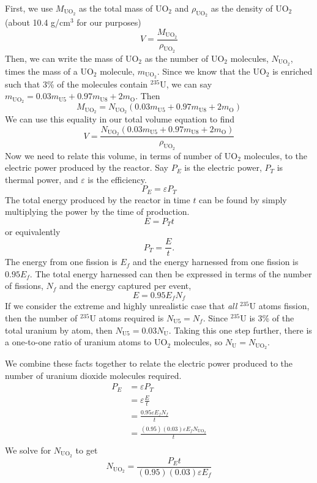 \documentclass{report}
\begin{document}
First, we use $M_{\text{UO}_2}$ as the total mass of UO$_2$ and $\rho_{\text{UO}_2}$ as the density of UO$_2$ (about 10.4 g/cm$^3$ for our purposes)
$$ V = \frac{M_{\text{UO}_2}}{\rho_{\text{UO}_2}} $$
Then, we can write the mass of UO$_2$ as the number of UO$_2$ molecules, $N_{\text{UO}_2}$, times the mass of a UO$_2$ molecule, $m_{\text{UO}_2}$. Since we know that the UO$_2$ is enriched such that 3\% of the molecules contain $^{235}$U, we can say $m_{\text{UO}_2} = 0.03m_{\text{U5}} + 0.97m_{\text{U8}} + 2m_{\text{O}}$. Then
$$ M_{\text{UO}_2} = N_{\text{UO}_2}(0.03m_{\text{U5}} + 0.97m_{\text{U8}} + 2m_{\text{O}}) $$
We can use this equality in our total volume equation to find
\begin{equation}
\label{vol}
V = \frac{N_{\text{UO}_2}(0.03m_{\text{U5}} + 0.97m_{\text{U8}} + 2 m_{\text{O}})}{\rho_{\text{UO}_2}}
\end{equation}
Now we need to relate this volume, in terms of number of UO$_2$ molecules, to the electric power produced by the reactor. Say $P_E$ is the electric power, $P_T$ is thermal power, and $\varepsilon$ is the efficiency. 
$$ P_E = \varepsilon P_T $$
The total energy produced by the reactor in time $t$ can be found by simply multiplying the power by the time of production.
$$ E = P_T t $$
or equivalently
$$ P_T = \frac{E}{t} .$$
The energy from one fission is $E_f$ and the energy harnessed from one fission is $0.95E_f$. The total energy harnessed can then be expressed in terms of the number of fissions, $N_f$ and the energy captured per event,
$$ E = 0.95E_f N_f $$
If we consider the extreme and highly unrealistic case that \textit{all} $^{235}$U atoms fission, then the number of $^{235}$U atoms required is $N_{\text{U5}} = N_f$. Since $^{235}$U is 3\% of the total uranium by atom, then $N_{\text{U5}} = 0.03N_{\text{U}}$. Taking this one step further, there is a one-to-one ratio of uranium atoms to UO$_2$ molecules, so $N_{\text{U}} = N_{\text{UO}_2}$.

We combine these facts together to relate the electric power produced to the number of uranium dioxide molecules required.
\begin{align*} 
P_E	&= \varepsilon P_T \\
	&= \varepsilon \frac{E}{t} \\
	&= \frac{0.95\varepsilon E_f N_f}{t} \\
	&= \frac{(0.95)(0.03)\varepsilon E_f N_{\text{UO}_2}}{t} \\
\end{align*}
We solve for $N_{\text{UO}_2}$ to get
\begin{equation}
\label{num}
N_{\text{UO}_2} = \frac{P_E t}{(0.95)(0.03)\varepsilon E_f}
\end{equation}
\end{document}
